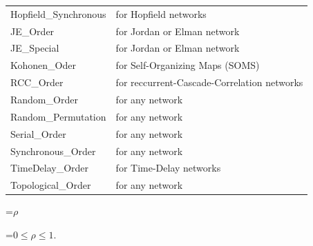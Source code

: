 {\begin{tabular}{|l|l|}
Hopfield\_Synchronous \hspace{0.5cm} & \hspace{0.5cm} for Hopfield networks\\ 
JE\_Order \hspace{0.5cm} & \hspace{0.5cm} for Jordan or Elman network\\ 
JE\_Special \hspace{0.5cm} & \hspace{0.5cm} for Jordan or Elman network\\ 
Kohonen\_Oder \hspace{0.5cm} & \hspace{0.5cm} for Self-Organizing Maps (SOMS)\\ 
RCC\_Order \hspace{0.5cm} & \hspace{0.5cm} for
reccurrent-Cascade-Correlation networks\\  
Random\_Order \hspace{0.5cm} & \hspace{0.5cm} for any network\\ 
Random\_Permutation \hspace{0.5cm} & \hspace{0.5cm} for any network\\ 
Serial\_Order \hspace{0.5cm} & \hspace{0.5cm} for any network\\ 
Synchronous\_Order \hspace{0.5cm} & \hspace{0.5cm} for any network\\ 
TimeDelay\_Order \hspace{0.5cm} & \hspace{0.5cm} for Time-Delay networks\\ 
Topological\_Order \hspace{0.5cm} & \hspace{0.5cm} for any network\\ 
\hline
\end{tabular}
}

{\newpage
\clearpage
\samepage \setbox\sizebox=\hbox{$\rho$}\box\sizebox
}

{\newpage
\clearpage
\samepage \setbox\sizebox=\hbox{$0 \leq \rho \leq 1.$}\box\sizebox
}

